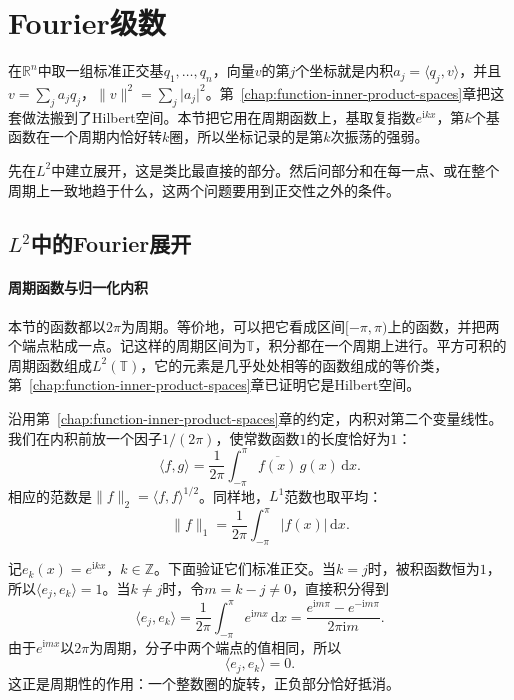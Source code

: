 \section{Fourier级数}
\label{sec:fourier-series}

在$\mathbb R^n$中取一组标准正交基$q_1,\ldots,q_n$，向量$v$的第$j$个坐标就是内积$a_j=\langle q_j,v\rangle$，并且$v=\sum_ja_jq_j$，$\lVert v\rVert^2=\sum_j\lvert a_j\rvert^2$。第~\ref{chap:function-inner-product-spaces}章把这套做法搬到了Hilbert空间。本节把它用在周期函数上，基取复指数$e^{\mathrm ikx}$，第$k$个基函数在一个周期内恰好转$k$圈，所以坐标记录的是第$k$次振荡的强弱。

先在$L^2$中建立展开，这是类比最直接的部分。然后问部分和在每一点、或在整个周期上一致地趋于什么，这两个问题要用到正交性之外的条件。

\subsection{\texorpdfstring{$L^2$}{L2}中的Fourier展开}
\label{sec:fourier-series-l2}

\paragraph{周期函数与归一化内积}

本节的函数都以$2\pi$为周期。等价地，可以把它看成区间$[-\pi,\pi)$上的函数，并把两个端点粘成一点。记这样的周期区间为$\mathbb T$，积分都在一个周期上进行。平方可积的周期函数组成$L^2(\mathbb T)$，它的元素是几乎处处相等的函数组成的等价类，第~\ref{chap:function-inner-product-spaces}章已证明它是Hilbert空间。

沿用第~\ref{chap:function-inner-product-spaces}章的约定，内积对第二个变量线性。我们在内积前放一个因子$1/(2\pi)$，使常数函数$1$的长度恰好为$1$：
\begin{equation}
\langle f,g\rangle=\frac1{2\pi}\int_{-\pi}^{\pi}\overline{f(x)}\,g(x)\,\mathrm dx .
\label{eq:fourier-circle-inner-product}
\end{equation}
相应的范数是$\lVert f\rVert_2=\langle f,f\rangle^{1/2}$。同样地，$L^1$范数也取平均：
\[
\lVert f\rVert_1=\frac1{2\pi}\int_{-\pi}^{\pi}\lvert f(x)\rvert\,\mathrm dx.
\]

记$e_k(x)=e^{\mathrm ikx}$，$k\in\mathbb Z$。下面验证它们标准正交。当$k=j$时，被积函数恒为$1$，所以$\langle e_j,e_k\rangle=1$。当$k\neq j$时，令$m=k-j\neq0$，直接积分得到
\[
\langle e_j,e_k\rangle=\frac1{2\pi}\int_{-\pi}^{\pi}e^{\mathrm imx}\,\mathrm dx
=\frac{e^{\mathrm im\pi}-e^{-\mathrm im\pi}}{2\pi\mathrm im}.
\]
由于$e^{\mathrm imx}$以$2\pi$为周期，分子中两个端点的值相同，所以
\[
\langle e_j,e_k\rangle=0.
\]
这正是周期性的作用：一个整数圈的旋转，正负部分恰好抵消。

